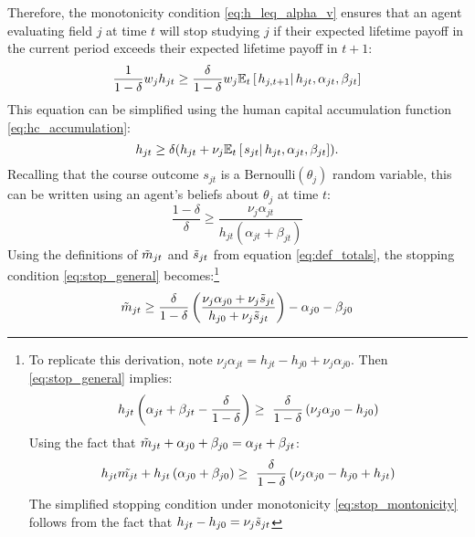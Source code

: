 Therefore, the monotonicity condition \eqref{eq:h_leq_alpha_v} ensures that an agent evaluating field $j$ at time $t$ will stop studying $j$ if their expected lifetime payoff in the current period exceeds their expected lifetime payoff in $t+1$:
\begin{equation*}
    \frac{1}{1 - \delta} w_j h_{jt} 
    \geq 
    \frac{\delta}{1 - \delta} w_j \mathbb{E}_t \left[\left. h_{j,t+1} \right\vert h_{jt}, \alpha_{jt}, \beta_{jt} \right]
\end{equation*}
This equation can be simplified using the human capital accumulation function \eqref{eq:hc_accumulation}:
\begin{equation*}
    h_{jt} \geq \delta (h_{jt} + \nu_j \mathbb{E}_t \left[\left. s_{jt} \right\vert h_{jt}, \alpha_{jt}, \beta_{jt}\right]).
\end{equation*}
Recalling that the course outcome $s_{jt}$ is a $\text{Bernoulli} (\theta_j)$ random variable, this can be written using an agent's beliefs about $\theta_j$ at time $t$:
\begin{equation}\label{eq:stop_general}
    \frac{1 - \delta}{\delta} \geq \frac{\nu_j \alpha_{jt}}{h_{jt} (\alpha_{jt} + \beta_{jt})}
\end{equation}
Using the definitions of $\tilde{m}_{jt}$ and $\tilde{s}_{jt}$ from equation \eqref{eq:def_totals}, the stopping condition \eqref{eq:stop_general} becomes:\footnote{
    To replicate this derivation, note $\nu_j \alpha_{jt} = h_{jt} - h_{j0} + \nu_j \alpha_{j0}$. 
    Then \eqref{eq:stop_general} implies:
    \begin{equation*}
        h_{jt} \left( \alpha_{jt} + \beta_{jt} - \frac{\delta}{1 - \delta} \right) 
        \geq \
        \frac{\delta}{1 - \delta} \left( \nu_j \alpha_{j0} - h_{j0} \right)
    \end{equation*}
    Using the fact that $\tilde{m}_{jt} + \alpha_{j0} + \beta_{j0} = \alpha_{jt} + \beta_{jt}$:
    \begin{equation*}
        h_{jt} \tilde{m_{jt}}
        + h_{jt} \left( \alpha_{j0} + \beta_{j0} \right) 
        \geq \
        \frac{\delta}{1 - \delta} \left( \nu_j \alpha_{j0} - h_{j0} + h_{jt} \right)
    \end{equation*}
    The simplified stopping condition under monotonicity \eqref{eq:stop_montonicity} follows from the fact that $h_{jt} - h_{j0} = \nu_j \tilde{s}_{jt}$
}
\begin{equation}\label{eq:stop_montonicity}
    \tilde{m}_{jt} \geq \frac{\delta}{1 - \delta}
    \left( 
        \frac{\nu_j \alpha_{j0} + \nu_j \tilde{s}_{jt}}{h_{j0} + \nu_j \tilde{s}_{jt}}
     \right) - \alpha_{j0} - \beta_{j0}
\end{equation}
